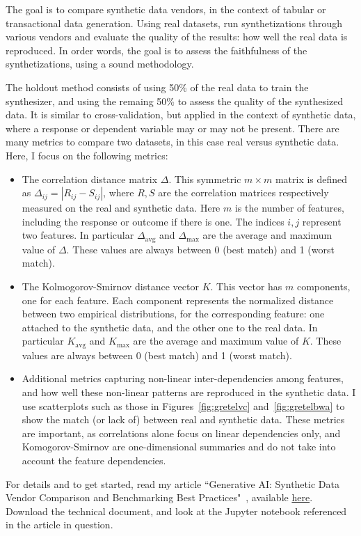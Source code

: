 \documentclass[oneside,10pt]{book}
\begin{document}
The goal is to compare synthetic data vendors, in the context of tabular or transactional data generation. Using real datasets, run synthetizations through various vendors and evaluate the quality of the results: how well the real data is reproduced. In order words, the goal is to 
 assess the \textcolor{index}{faithfulness} of the synthetizations, using a sound methodology.

The \textcolor{index}{holdout method} consists of using 50\% of the real data to train the synthesizer, and using the remaing 50\% to assess the quality of the 
 synthesized data. It is
 similar to cross-validation, but applied in the context of synthetic data, where a response or dependent variable may or may not be present. 
There are many metrics to compare two datasets, in this case real versus synthetic data. Here, I focus on the following metrics:\vspace{1ex}

\begin{itemize}
\item The \textcolor{index}{correlation distance matrix} $\Delta$. This symmetric $m\times m$ matrix is defined as $\Delta_{ij} = | R_{ij} - S_{ij}|$, where $R,S$ are the correlation matrices respectively measured on the real and synthetic data. Here $m$ is the number of features, including the response or outcome if there is one. The indices $i,j$ represent two features. In particular $\Delta_{\text{avg}}$ and $\Delta_{\text{max}}$ are the average and maximum value of $\Delta$. These values are always between 0 (best match) and 1 (worst match). 
\item The \textcolor{index}{Kolmogorov-Smirnov distance} vector $K$. This vector has $m$ components, one for each feature. Each component represents the 
  normalized distance between two empirical distributions, for the corresponding feature: one attached to the synthetic data, and the other one
 to the real data. In particular $K_{\text{avg}}$ and $K_{\text{max}}$ are the average and maximum value of $K$. These values are always between 0 (best match) and 1 (worst match). 
 \item Additional metrics capturing non-linear inter-dependencies among features, and how well these non-linear patterns are reproduced in the synthetic data. I use scatterplots such as those in Figures~\ref{fig:gretelvc} and~\ref{fig:gretelbwa} to show the match (or lack of) between real and synthetic data. These metrics are important, as correlations alone focus on linear dependencies only, and Komogorov-Smirnov are one-dimensional summaries and do not take into account the feature dependencies. 
\end{itemize}\vspace{1ex}
For details and to get started, read my article ``Generative AI: Synthetic Data Vendor Comparison and Benchmarking Best Practices"~\cite{vgvendors},
 available \href{https://mltechniques.com/2023/06/16/generative-ai-synthetic-data-vendor-comparison-and-benchmarking-best-practices/}{here}.
 Download the technical document, and look at the Jupyter notebook referenced in the article in question.  
\end{document}
